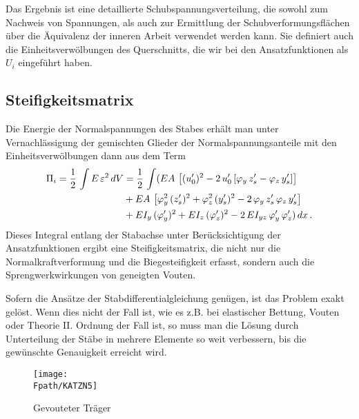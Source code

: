Das Ergebnis ist eine detaillierte Schubspannungsverteilung, die sowohl zum Nachweis von Spannungen, als auch zur Ermittlung der Schubverformungsfl\"{a}chen \"{u}ber die \"{A}quivalenz der inneren Arbeit verwendet werden kann. Sie definiert auch die Einheitsverw\"{o}lbungen des Querschnitts, die wir bei den Ansatzfunktionen als $U_i$ eingef\"{u}hrt haben.
{\textcolor{sectionTitleBlue}{\subsection{Steifigkeitsmatrix}}}
Die Energie der Normalspannungen des Stabes erh\"{a}lt man unter Vernachl\"{a}ssigung der gemischten Glieder der Normalspannungsanteile mit den Einheitsverw\"{o}lbungen dann aus dem Term
\begin{align}
\Pi_i = \frac{1}{2}\,\int E\,\varepsilon^2\,dV &= \frac{1}{2}\,\int ( EA
\,\left[(u_0')^2 -
2\,u_0'\,[\varphi_y\,z_s' - \varphi_z\,y_s'] \right] \nonumber \\
&+ EA\,\left[\varphi_y^2\,(z_s')^2 + \varphi_z^2\,(y_s')^2 -
2\,\varphi_y\,z_s'\,\varphi_z\,y_s'\right] \nonumber \\
&+ EI_y\,(\varphi_y')^2 + EI_z\,(\varphi_z')^2 -
2\,EI_{yz}\,\varphi_y'\,\varphi_z')\,dx\,.
\end{align}
Dieses Integral entlang der Stabachse unter Ber\"{u}cksichtigung der Ansatzfunktionen ergibt eine Steifigkeitsmatrix, die nicht nur die Normalkraftverformung und die Biegesteifigkeit erfasst, sondern auch die Sprengwerkwirkungen von geneigten Vouten.

Sofern die Ans\"{a}tze der Stabdifferentialgleichung gen\"{u}gen, ist das Problem exakt gel\"{o}st. Wenn dies nicht der Fall ist, wie es z.B. bei elastischer Bettung, Vouten oder Theorie II. Ordnung der Fall ist, so muss man die L\"{o}sung durch Unterteilung der St\"{a}be in mehrere Elemente so weit verbessern, bis die gew\"{u}nschte Genauigkeit erreicht wird.
\begin{figure}[tbp] \centering
\if {} \sidecaption \fi
\texttt{[image: \\Fpath/KATZN5]}
\caption{Gevouteter Tr\"{a}ger}
\label{KatzN5}%
\end{figure}%

